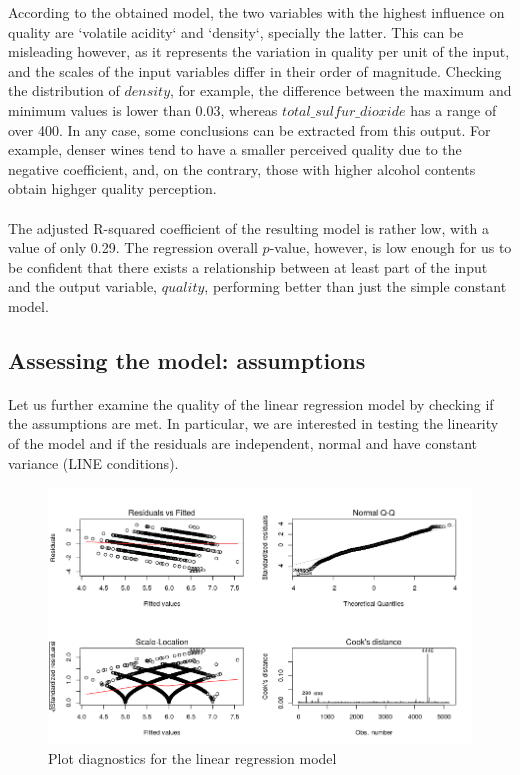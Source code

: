 \documentclass[10pt]{article}
\begin{document}
According to the obtained model, the two variables with the highest influence on quality are `volatile acidity` and `density`, specially the latter. This can be misleading however, as it represents the variation in quality per unit of the input, and the scales of the input variables differ in their order of magnitude. Checking the distribution of $density$, for example, the difference between the maximum and minimum values is lower than 0.03, whereas $total\_sulfur\_dioxide$ has a range of over 400. In any case, some conclusions can be extracted from this output. For example, denser wines tend to have a smaller perceived quality due to the negative coefficient, and, on the contrary, those with higher alcohol contents obtain highger quality perception.

\paragraph*{}
The adjusted R-squared coefficient of the resulting model is rather low, with a value of only 0.29. The regression overall $p$-value, however, is low enough for us to be confident that there exists a relationship between at least part of the input and the output variable, $quality$, performing better than just the simple constant model.

\subsection{Assessing the model: assumptions}

\paragraph*{}
Let us further examine the quality of the linear regression model by checking if the assumptions are met. In particular, we are interested in testing the linearity of the model and if the residuals are independent, normal and have constant variance (LINE conditions).

\begin{figure}[H]
	\centering
	\includegraphics[width=5in]{figures/qqplot.png}
	\caption{Plot diagnostics for the linear regression model} 
	\label{figure:qqplot}
\end{figure}
\end{document}
